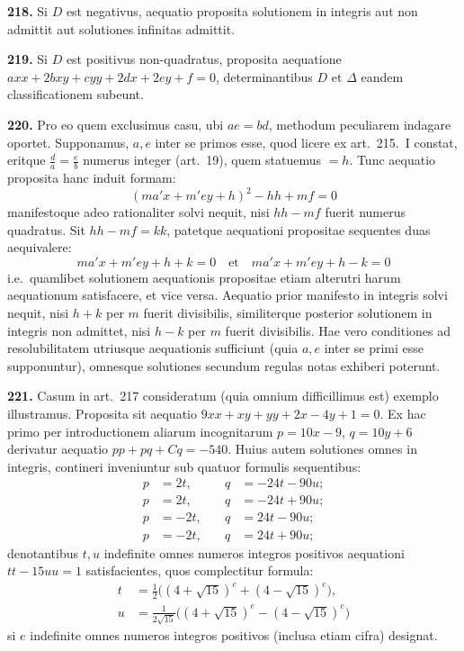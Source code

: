 \documentclass[12pt,a4paper]{article}
\theoremstyle{plain}
\theoremstyle{definition}
\theoremstyle{remark}
\begin{document}
\textbf{218.} Si $D$ est negativus, aequatio proposita solutionem in integris aut non admittit aut solutiones infinitas admittit.

\textbf{219.} Si $D$ est positivus non-quadratus, proposita aequatione $axx+2bxy+cyy+2dx+2ey+f=0$, determinantibus $D$ et $\Delta$ eandem classificationem subeunt.

\textbf{220.} Pro eo quem exclusimus casu, ubi $ae=bd$, methodum peculiarem indagare oportet. Supponamus, $a,e$ inter se primos esse, quod licere ex art.~215.~I constat, eritque $\frac{d}{a}=\frac{e}{b}$ numerus integer (art.~19), quem statuemus $=h$. Tunc aequatio proposita hanc induit formam:
\[
(ma'x+m'e y+h)^2-hh+mf=0
\]
manifestoque adeo rationaliter solvi nequit, nisi $hh-mf$ fuerit numerus quadratus. Sit $hh-mf=kk$, patetque aequationi propositae sequentes duas aequivalere:
\[
ma'x+m'e y+h+k=0\quad\text{et}\quad ma'x+m'e y+h-k=0
\]
i.e.\ quamlibet solutionem aequationis propositae etiam alterutri harum aequationum satisfacere, et vice versa. Aequatio prior manifesto in integris solvi nequit, nisi $h+k$ per $m$ fuerit divisibilis, similiterque posterior solutionem in integris non admittet, nisi $h-k$ per $m$ fuerit divisibilis. Hae vero conditiones ad resolubilitatem utriusque aequationis sufficiunt (quia $a,e$ inter se primi esse supponuntur), omnesque solutiones secundum regulas notas exhiberi poterunt.

\textbf{221.} Casum in art.~217 consideratum (quia omnium difficillimus est) exemplo illustramus. Proposita sit aequatio $9xx+xy+yy+2x-4y+1=0$. Ex hac primo per introductionem aliarum incognitarum $p=10x-9$, $q=10y+6$ derivatur aequatio $pp+pq+Cq=-540$. Huius autem solutiones omnes in integris, contineri inveniuntur sub quatuor formulis sequentibus:
\begin{align*}
p&=2t,\quad &q&=-24t-90u;\\
p&=2t,\quad &q&=-24t+90u;\\
p&=-2t,\quad &q&=24t-90u;\\
p&=-2t,\quad &q&=24t+90u;
\end{align*}
denotantibus $t,u$ indefinite omnes numeros integros positivos aequationi $tt-15uu=1$ satisfacientes, quos complectitur formula:
\begin{align*}
t&=\tfrac{1}{2}\bigl((4+\sqrt{15})^e+(4-\sqrt{15})^e\bigr),\\
u&=\tfrac{1}{2\sqrt{15}}\bigl((4+\sqrt{15})^e-(4-\sqrt{15})^e\bigr)
\end{align*}
si $e$ indefinite omnes numeros integros positivos (inclusa etiam cifra) designat.
\end{document}
